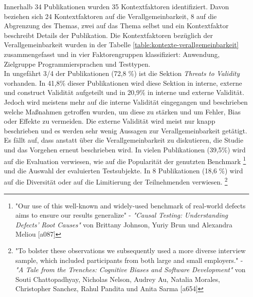 Innerhalb 34 Publikationen wurden 35 Kontextfaktoren identifiziert.
Davon beziehen sich 24 Kontextfaktoren auf die Verallgemeinbarkeit,
8 auf die Abgrenzung des Themas, zwei auf das Thema selbst und ein Kontextfaktor beschreibt Details der Publikation.
Die Kontextfaktoren bezüglich der Verallgemeinbarkeit wurden in der Tabelle \ref{table:kontexte-verallgemeinbarkeit} zusammengefasst und in vier Faktorengruppen klassifiziert: Anwendung, Zielgruppe Programmiersprachen und Testtypen.
\\





\clearpage
In ungefährt 3/4 der Publikationen (72,8 \%) ist die Sektion \textit{Threats to Validity} vorhanden. In 41,8\% dieser Publikationen wird diese Sektion in interne, externe und construct Validität aufgeteilt und in 20,9\% in interne und externe Validität. Jedoch wird meistens mehr auf die interne Validität eingegangen und beschrieben welche Maßnahmen getroffen wurden, um diese zu stärken und um Fehler, Bias oder Effekte zu vermeiden. Die externe Validität wird meist nur knapp beschrieben und es werden sehr wenig Aussagen zur Verallgemeinbarkeit getätigt. \\
Es fällt auf, dass anstatt über die Verallgemeinbarkeit zu diskutieren, die Studie und das Vorgehen erneut beschrieben wird. In vielen Publikationen (39,5\%) wird auf die Evaluation verwiesen, wie auf die Popularität der genutzten Benchmark
\footnote{ "Our use of this well-known and widely-used benchmark of real-world defects aims to ensure our results generalize" - \textit{"Causal Testing: Understanding Defects’ Root Causes"} von Brittany Johnson, Yuriy Brun und Alexandra Meliou [a087]}
und die Auswahl der evaluierten Testsubjekte.
In 8 Publikationen (18,6 \%) wird auf die Diversität oder auf die Limitierung der Teilnehmenden verwiesen.
\footnote{ "To bolster these observations we subsequently used a more diverse interview sample, which included participants from both large and small employers." - \textit{"A Tale from the Trenches: Cognitive Biases and Software Development"} von Souti Chattopadhyay, Nicholas Nelson, Audrey Au, Natalia Morales, Christopher Sanchez, Rahul Pandita und Anita Sarma [a654]} \\


\clearpage


